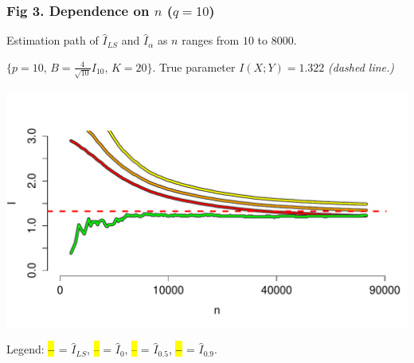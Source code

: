 \documentclass{beamer}
\makeatletter
\newcommand\SoulColor{%
  \let\set@color\beamerorig@set@color
  \let\reset@color\beamerorig@reset@color}
\makeatother
\begin{document}
\begin{frame}
\frametitle{Fig 3. Dependence on $n$ ($q = 10$)}
Estimation path of $\hat{I}_{LS}$ and $\hat{I}_\alpha$ as $n$ ranges from $10$ to $8000$.

\small{$\{p = 10$, $B = \frac{4}{\sqrt{10}} I_{10}$, $K = 20\}$.
True parameter $I(X; Y) = 1.322$ \emph{(dashed line.)}}

\begin{center}
\includegraphics[scale = 0.4]{../info_theory_sims/fig3.pdf}
\end{center}

Legend: \textbf{\textcolor{green}{\SoulColor\hl{ -- }}} = $\hat{I}_{LS}$, \textcolor{red}{\SoulColor\hl{ -- }} = $\hat{I}_0$, \textcolor{orange}{\SoulColor\hl{ -- }} = $\hat{I}_{0.5}$,
\textbf{\textcolor{yellow}{\SoulColor\hl{ -- }}} = $\hat{I}_{0.9}$.

\end{frame}
\end{document}
